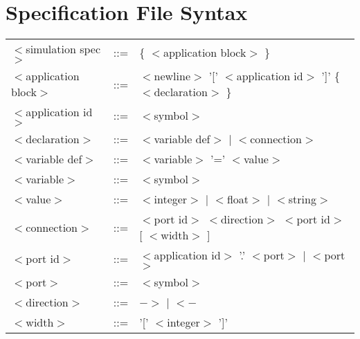 \documentclass[a4paper,twoside]{report}
\begin{document}
\chapter{Specification File Syntax}
\label{sec:specsyntax}

\newcommand{\nt}[1]{$<$#1$>$}

\begin{tabular}{lcl}
\nt{simulation spec}   & ::= & \{ \nt{application block} \} \\
\nt{application block} & ::= & \nt{newline} '[' \nt{application id} ']' \{ \nt{declaration}
\} \\
\nt{application id}    & ::= & \nt{symbol} \\
\nt{declaration}       & ::= & \nt{variable def} $|$ \nt{connection} \\
\nt{variable def}      & ::= & \nt{variable} '=' \nt{value} \\
\nt{variable}	       & ::= & \nt{symbol} \\
\nt{value} 	       & ::= & \nt{integer} $|$ \nt{float} $|$ \nt{string} \\
\nt{connection}	       & ::= & \nt{port id} \nt{direction} \nt{port id} [ \nt{width} ] \\
\nt{port id}	       & ::= & \nt{application id} '.' \nt{port} $|$
\nt{port} \\
\nt{port}	       & ::= & \nt{symbol} \\
\nt{direction}	       & ::= & $->$ $|$ $<-$ \\
\nt{width}	       & ::= & '[' \nt{integer} ']' \\
\end{tabular}

\printindex
\end{document}
